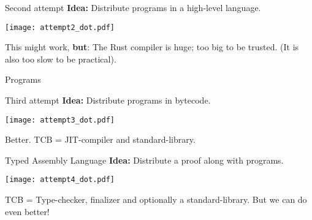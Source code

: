\begin{frame}[fragile]{Second attempt}
  \textbf{Idea:} Distribute programs in a high-level language.

  \texttt{[image: attempt2\_dot.pdf]}

  \pause This might work, \textbf{but}: The Rust compiler is huge; too big to be
  trusted. (It is also too slow to be practical).
\end{frame}

\begin{frame}{Programs}{}
\end{frame}

\begin{frame}[fragile]{Third attempt}
  \textbf{Idea:} Distribute programs in bytecode.

  \pause \texttt{[image: attempt3\_dot.pdf]}

  \pause Better. TCB = JIT-compiler and standard-library.
\end{frame}

\begin{frame}[fragile]{Typed Assembly Language}
  \textbf{Idea:} Distribute a proof along with programs.

  \pause \texttt{[image: attempt4\_dot.pdf]}

  \pause TCB = Type-checker, finalizer and optionally a standard-library. \pause
  But we can do even better!
\end{frame}

